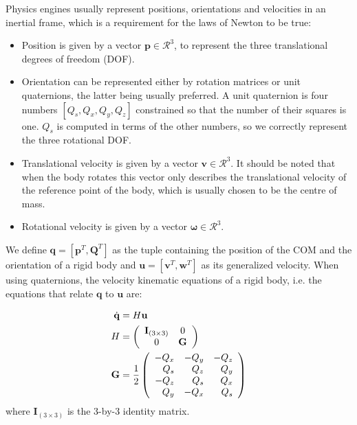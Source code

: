 Physics engines usually represent positions, orientations and velocities in an inertial frame, which is a requirement for the laws of Newton to be true: 
\begin{itemize}
	\item Position is given by a vector $\mathbf{p} \in \mathcal{R}^3$, to represent the three translational degrees of freedom (DOF).
	\item Orientation can be represented either by rotation matrices or unit quaternions, the latter being usually preferred. A unit quaternion is four numbers $[Q_s, Q_x, Q_y, Q_z]$ constrained so that the number of their squares is one. $Q_s$ is computed in terms of the other numbers, so we correctly represent the three rotational DOF.
	\item Translational velocity is given by a vector $\mathbf{v} \in \mathcal{R}^3$. It should be noted that when the body rotates this vector only describes the translational velocity of the reference point of the body, which is usually chosen to be the centre of mass.
	\item Rotational velocity is given by a vector $\boldsymbol{\omega} \in \mathcal{R}^3$.
\end{itemize}
We define $\mathbf{q} = [\mathbf{p}^T, \mathbf{Q}^T]$ as the tuple containing the position of the COM and the orientation of a rigid body and $\mathbf{u} = [\mathbf{v}^T, \mathbf{w}^T]$ as its generalized velocity. When using quaternions, the velocity kinematic equations of a rigid body, i.e. the equations that relate $\mathbf{q}$ to $\mathbf{u}$ are:

\begin{align}
	\dot{\mathbf{q}} &= H\mathbf{u} \label{eq:kinematic}\\
	H &= \left(\begin{array}{c c}
		\mathbf{I}_{(3\times3)} & 0\\
		0 & \mathbf{G} \\
	\end{array}\right)\\
	\mathbf{G} &= \frac{1}{2}\left(\begin{array}{r r r}
		-Q_x & -Q_y & -Q_z \\
		Q_s  & Q_z  & Q_y  \\
		-Q_z & Q_s  & Q_x  \\
		Q_y  & -Q_x & Q_s
	\end{array}\right)\\
\end{align}
where $\mathbf{I}_{(3\times3)}$ is the 3-by-3 identity matrix.

